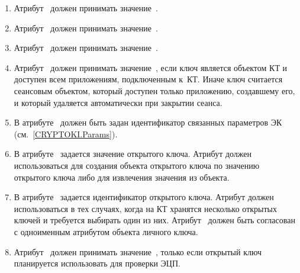 \begin{enumerate}
\item
Атрибут~ должен принимать значение~.

\item
Атрибут~ должен принимать значение~.

\item
Атрибут~ должен принимать значение~.

\item
Атрибут~ должен принимать значение~,
если ключ является объектом КТ и доступен всем приложениям, подключенным 
к~КТ.  
%
Иначе ключ считается сеансовым объектом, который доступен только приложению, 
создавшему его, и который удаляется автоматически при закрытии сеанса.
%

\item
В атрибуте~ должен быть задан идентификатор связанных 
параметров ЭК (см.~\ref{CRYPTOKI.Params}).

\item
В атрибуте~ задается значение открытого ключа. 
Атрибут должен использоваться для создания объекта открытого ключа 
по значению открытого ключа либо для извлечения значения из объекта. 

\item
В атрибуте~ задается идентификатор открытого ключа. 
Атрибут должен использоваться в тех случаях, когда на КТ  
хранятся несколько открытых ключей и требуется выбирать один из них. 
%
Атрибут~ должен быть согласован с одноименным атрибутом 
объекта личного ключа.

\item
Атрибут~ должен принимать значение~, 
только если открытый ключ планируется использовать для проверки ЭЦП.


\end{enumerate}
